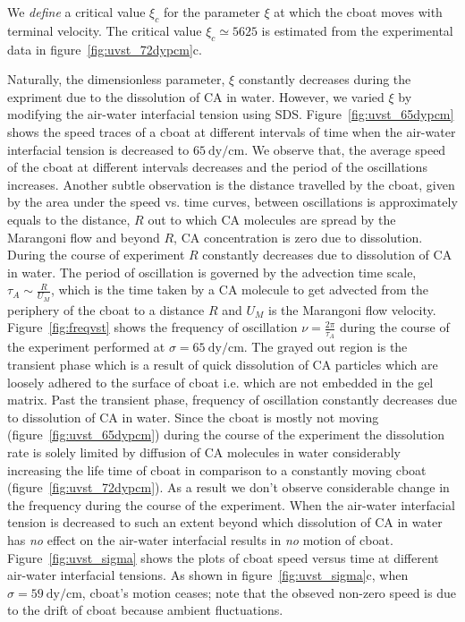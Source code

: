\documentclass[journal=langd5, manuscript=article, layout=onecolumn]{achemso}
\begin{document}
We \emph{define} a critical value $\xi_{c}$ for the parameter $\xi$ at which the cboat moves with terminal velocity. The critical value $\xi_{c} \simeq 5625$ is estimated from the experimental data in figure~\ref{fig:uvst_72dypcm}c. \par
Naturally, the dimensionless parameter, $\xi$ constantly decreases during the expriment due to the dissolution of CA in water. However, we varied $\xi$ by modifying the air-water interfacial tension using SDS. Figure~\ref{fig:uvst_65dypcm} shows the speed traces of a cboat at different intervals of time when the air-water interfacial tension is decreased to $65\ \mathrm{dy/cm}$. We observe that, the average speed of the cboat at different intervals decreases and the period of the oscillations increases. Another subtle observation is the distance travelled by the cboat, given by the area under the speed vs. time curves, between oscillations is approximately equals to the distance, $R$ out to which CA molecules are spread by the Marangoni flow and beyond $R$, CA concentration is zero due to dissolution. During the course of experiment $R$ constantly decreases due to dissolution of CA in water. The period of oscillation is governed by the advection time scale, $\tau_{A} \sim \frac{R}{U_{M}}$, which is the time taken by a CA molecule to get advected from the periphery of the cboat to a distance $R$ and $U_{M}$ is the Marangoni flow velocity. Figure~\ref{fig:freqvst} shows the frequency of oscillation $\nu = \frac{2\pi}{\tau_{A}}$ during the course of the experiment performed at $\sigma = 65\ \mathrm{dy/cm}$. The grayed out region is the transient phase which is a result of quick dissolution of CA particles which are loosely adhered to the surface of cboat i.e. which are not embedded in the gel matrix. Past the transient phase, frequency of oscillation constantly decreases due to dissolution of CA in water. Since the cboat is mostly not moving (figure~\ref{fig:uvst_65dypcm}) during the course of the experiment the dissolution rate is solely limited by diffusion of CA molecules in water considerably increasing the life time of cboat in comparison to a constantly moving cboat (figure~\ref{fig:uvst_72dypcm}). As a result we don't observe considerable change in the frequency during the course of the experiment. When the air-water interfacial tension is decreased to such an extent beyond which dissolution of CA in water has \emph{no} effect on the air-water interfacial results in \emph{no} motion of cboat. Figure~\ref{fig:uvst_sigma} shows the plots of cboat speed versus time at different air-water interfacial tensions. As shown in figure~\ref{fig:uvst_sigma}c, when $\sigma = 59\ \mathrm{dy/cm}$, cboat's motion ceases; note that the obseved non-zero speed is due to the drift of cboat because ambient fluctuations.   
\end{document}
